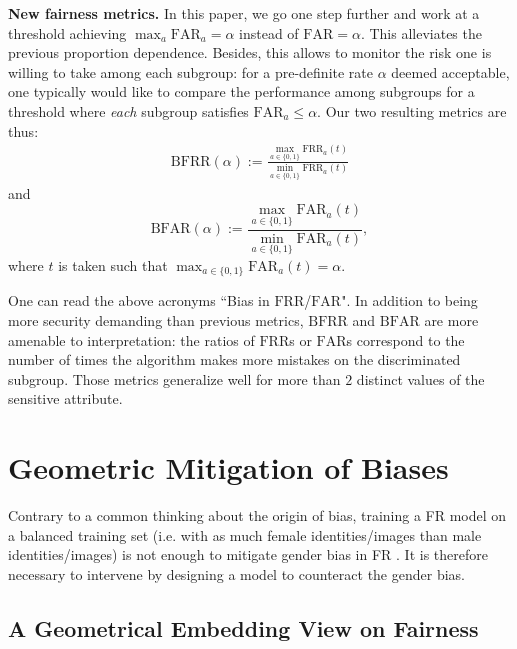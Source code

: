 \documentclass[nohyperref]{article}
\theoremstyle{plain}
\theoremstyle{definition}
\theoremstyle{remark}
\begin{document}
{\bf New fairness metrics. }In this paper, we go one step further and work at a threshold achieving $\max_a \mathrm{FAR}_a=\alpha$ instead of $\mathrm{FAR}=\alpha$. This alleviates the previous proportion dependence. Besides, this allows to monitor the risk one is willing to take among each subgroup: for a pre-definite rate $\alpha$ deemed acceptable, one typically would like to compare the performance among subgroups for a threshold where {\it each} subgroup satisfies $\mathrm{FAR}_a \leq \alpha$. Our two resulting metrics are thus:
\begin{align} \label{eq:fairness_metric1}
\mathrm{BFRR}(\alpha) := \frac{\max_{a \in \{0,1\}} \mathrm{FRR}_a(t)}{\min_{a \in \{0,1\}} \mathrm{FRR}_a(t)} 
\end{align}
and
\begin{equation} \label{eq:fairness_metric2}
\mathrm{BFAR}(\alpha) := \frac{\max_{a \in \{0,1\}} \mathrm{FAR}_a(t)}{\min_{a \in \{0,1\}} \mathrm{FAR}_a(t)},
\end{equation} 
where $t$ is taken such that $\max_{a \in \{0, 1\}} \mathrm{FAR}_a(t) = \alpha $.


One can read the above acronyms ``Bias in $\mathrm{FRR}$/$\mathrm{FAR}$". In addition to being more security demanding than previous metrics, $\mathrm{BFRR}$ and $\mathrm{BFAR}$ are more amenable to interpretation: the ratios of $\mathrm{FRR}$s or $\mathrm{FAR}$s correspond to the number of times the algorithm makes more mistakes on the discriminated subgroup. Those metrics generalize well for more than $2$ distinct values of the sensitive attribute. 
\section{Geometric Mitigation of Biases}\label{sec:vMF for eth mod}

Contrary to a common thinking about the origin of bias, training a FR model on a balanced training set (i.e. with as much female identities/images than male identities/images) is not enough to mitigate gender bias in FR \cite{gender_balanced_data}. It is therefore necessary to intervene by designing a model to counteract the gender bias.



\subsection{A Geometrical Embedding View on Fairness}\label{subsec:geometrical_causes_bias}
\end{document}
